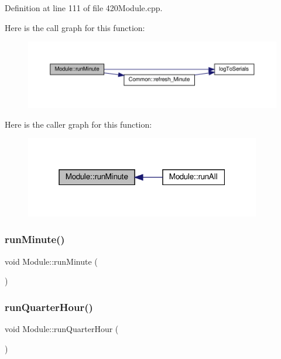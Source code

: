 Definition at line 111 of file 420\+Module.\+cpp.

Here is the call graph for this function\+:
\nopagebreak
\begin{figure}[H]
\begin{center}
\leavevmode
\includegraphics[width=350pt]{class_module_aa13cfb83b001955abfeb3b87789a7ab8_cgraph}
\end{center}
\end{figure}
Here is the caller graph for this function\+:
\nopagebreak
\begin{figure}[H]
\begin{center}
\leavevmode
\includegraphics[width=292pt]{class_module_aa13cfb83b001955abfeb3b87789a7ab8_icgraph}
\end{center}
\end{figure}
\mbox{\label{class_module_aa13cfb83b001955abfeb3b87789a7ab8}} 
\subsubsection{\texorpdfstring{run\+Minute()}{runMinute()}\hspace{0.1cm}{\footnotesize\ttfamily [2/2]}}
{\footnotesize\ttfamily void Module\+::run\+Minute (\begin{DoxyParamCaption}{ }\end{DoxyParamCaption})}

\mbox{\label{class_module_af56e1160074693aaa5699fafaae9d8be}} 
\subsubsection{\texorpdfstring{run\+Quarter\+Hour()}{runQuarterHour()}\hspace{0.1cm}{\footnotesize\ttfamily [1/2]}}
{\footnotesize\ttfamily void Module\+::run\+Quarter\+Hour (\begin{DoxyParamCaption}{ }\end{DoxyParamCaption})}

